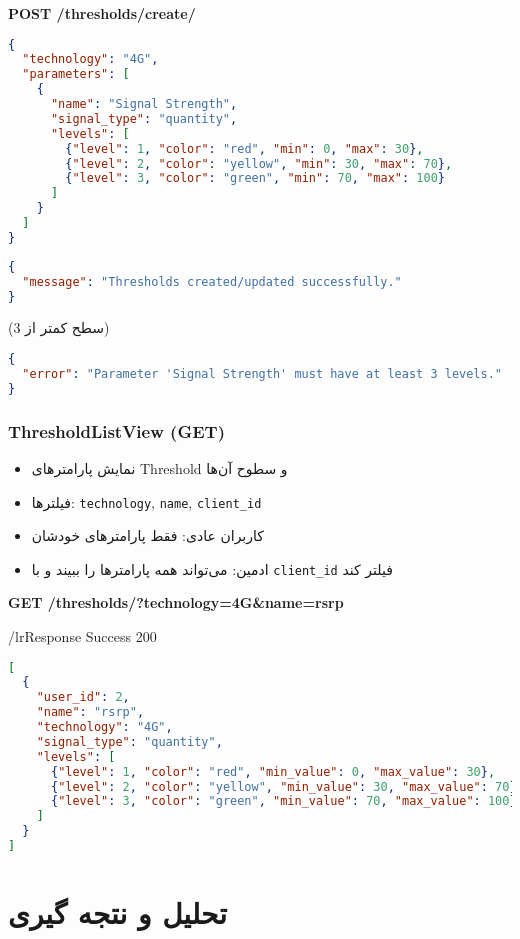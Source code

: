 \documentclass{report}
\begin{document}
\textbf{POST /thresholds/create/ }
\begin{lstlisting}[language=json]
{
  "technology": "4G",
  "parameters": [
    {
      "name": "Signal Strength",
      "signal_type": "quantity",
      "levels": [
        {"level": 1, "color": "red", "min": 0, "max": 30},
        {"level": 2, "color": "yellow", "min": 30, "max": 70},
        {"level": 3, "color": "green", "min": 70, "max": 100}
      ]
    }
  ]
}
\end{lstlisting}

\begin{lstlisting}[language=json]
{
  "message": "Thresholds created/updated successfully."
}
\end{lstlisting}

(سطح کمتر از 3)
\begin{lstlisting}[language=json]
{
  "error": "Parameter 'Signal Strength' must have at least 3 levels."
}
\end{lstlisting}

\subsection{ThresholdListView (GET)}
\begin{itemize}
    \item نمایش پارامترهای Threshold و سطوح آن‌ها
    \item فیلترها: \texttt{technology}, \texttt{name}, \texttt{client\_id}
    \item کاربران عادی: فقط پارامترهای خودشان
    \item ادمین: می‌تواند همه پارامترها را ببیند و با \texttt{client\_id} فیلتر کند
\end{itemize}

\textbf{GET /thresholds/?technology=4G&name=rsrp}

/lr{Response Success 200}
\begin{lstlisting}[language=json]
[
  {
    "user_id": 2,
    "name": "rsrp",
    "technology": "4G",
    "signal_type": "quantity",
    "levels": [
      {"level": 1, "color": "red", "min_value": 0, "max_value": 30},
      {"level": 2, "color": "yellow", "min_value": 30, "max_value": 70},
      {"level": 3, "color": "green", "min_value": 70, "max_value": 100}
    ]
  }
]
\end{lstlisting}



\chapter{ }

\section{ }

\section{ }

\chapter{تحلیل و نتجه گیری}
 
\end{document}

